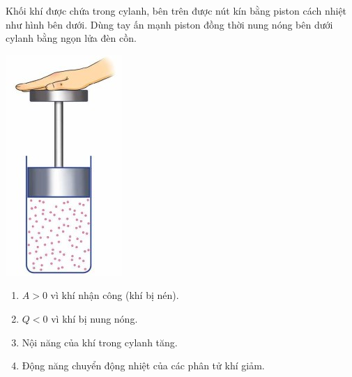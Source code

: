 \begin{ex}
		Khối khí được chứa trong cylanh, bên trên được nút kín bằng piston cách nhiệt như hình bên dưới. Dùng tay ấn mạnh piston đồng thời nung nóng bên dưới cylanh bằng ngọn lửa đèn cồn.
	\begin{center}
		\includegraphics[width=0.15\linewidth]{figs/VN12-Y24-PH-SYL-003P-3}
	\end{center}
	\begin{enumerate}[label=\alph*)]
		\item $A>0$ vì khí nhận công (khí bị nén).
		\item $Q<0$ vì khí bị nung nóng.
		\item Nội năng của khí trong cylanh tăng.
		\item Động năng chuyển động nhiệt của các phân tử khí giảm.
	\end{enumerate}
	

	\end{ex}

